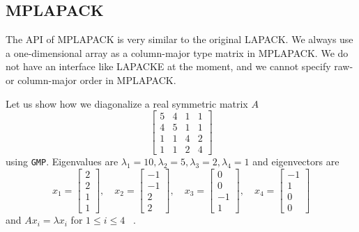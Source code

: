 \documentclass[12pt]{article}
\begin{document}
\subsection{MPLAPACK}
The API of MPLAPACK is very similar to the original LAPACK. We always use a one-dimensional array as a column-major type matrix in MPLAPACK. We do not have an interface like LAPACKE at the moment, and we cannot specify raw- or column-major order in MPLAPACK.

Let us show how we diagonalize a real symmetric matrix $A$
\[
\left[\begin{array}{llll}5 & 4 & 1 & 1 \\ 4 & 5 & 1 & 1 \\ 1 & 1 & 4 & 2 \\ 1 & 1 & 2 & 4\end{array}\right]
\]
using {\tt GMP}. Eigenvalues are $\lambda_1 = 10, \lambda_2 = 5, \lambda_3 = 2, \lambda_4 = 1$ and eigenvectors are
\[
x_{1}=\left[\begin{array}{l}2 \\ 2 \\ 1 \\ 1\end{array}\right], \quad x_{2}=\left[\begin{array}{c}-1 \\ -1 \\ 2 \\ 2\end{array}\right], \quad x_{3}=\left[\begin{array}{c}0 \\ 0 \\ -1 \\ 1\end{array}\right], \quad x_{4}=\left[\begin{array}{c}-1 \\ 1 \\ 0 \\ 0\end{array}\right]
\]
and $A x_{i} = \lambda x_{i}$ for $1\leq i \leq 4$ ~\cite{Gregory1969ACO}.
\end{document}
